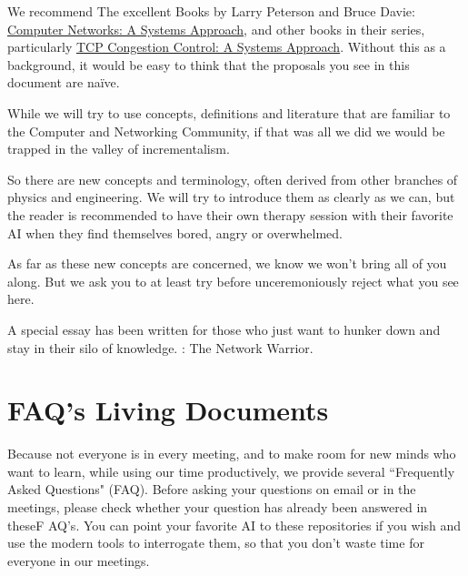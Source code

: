 \documentclass[../HFT-main.tex]{subfiles} %
\begin{document}
We recommend The excellent Books by Larry Peterson and Bruce Davie: \href{https://book.systemsapproach.org}{Computer Networks: A Systems Approach}, and other books in their series, particularly \href{https://tcpcc.systemsapproach.org}{TCP Congestion Control: A Systems Approach}.   Without this as a background, it would be easy to think that the proposals you see in this document are naïve.

While we will try to use concepts, definitions and literature that are familiar to the Computer and Networking Community, if that was all we did we would be trapped in the valley of incrementalism.

So there are new concepts and terminology, often derived from other branches of physics and engineering. We will try to introduce them as clearly as we can, but the reader is recommended to have their own therapy session with their favorite AI when they find themselves bored, angry or overwhelmed.

As far as these new concepts are concerned, we know we won't bring all of you along.  But we ask you to at least try before unceremoniously reject what you see here. 

A special essay has been written for those who just want to hunker down and stay in their silo of knowledge.   : The Network Warrior.  

\section{FAQ's Living Documents}

Because not everyone is in every meeting, and to make room for new minds who want to learn, while using our time productively, we provide several ``Frequently Asked Questions" (FAQ).  Before asking your questions on email or in the meetings, please check whether your question has already been answered in theseF AQ's. You can point your favorite AI to these repositories if you wish and use the modern tools to interrogate them, so that you don't waste time for everyone in our meetings.
\end{document}
